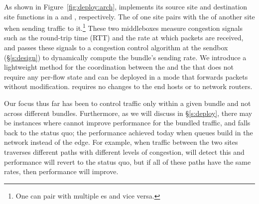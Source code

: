 



As shown in Figure~\ref{fig:deploy:arch}, \name implements its source site and destination site functions in a \emph{\inbox} and \emph{\outbox}, respectively. The \inbox of one site pairs with the \outbox of another site when sending traffic to it.\footnote{One \inbox can pair with multiple {\outbox}es and vice versa.} 
These two middleboxes measure congestion signals such as the round-trip time (RTT) and the rate at which packets are received, and passes these signals to a congestion control algorithm at the sendbox (\S\ref{s:design}) to dynamically compute the bundle's sending rate.
We introduce a lightweight method for the coordination between the \inbox and the \outbox that does not require any per-flow state and can be deployed in a mode that forwards packets without modification.  \name requires no changes to the end hosts or to network routers.
 
Our focus thus far has been to control traffic only within a given bundle and not across different bundles. 
Furthermore, as we will discuss in \S\ref{s:deploy}, there may be instances where \name cannot improve performance for the bundled traffic, and falls back to the status quo; \ie the performance achieved today when queues build in the network instead of the edge. For example, when traffic between the two sites traverses different paths with different levels of congestion, \name will detect this and performance will revert to the status quo, but if all of these paths have the same rates, then performance will improve. 
 
